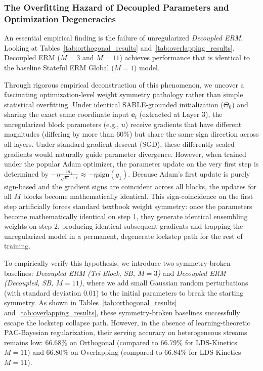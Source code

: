 \subsubsection{The Overfitting Hazard of Decoupled Parameters and Optimization Degeneracies}
An essential empirical finding is the failure of unregularized \emph{Decoupled ERM}. Looking at Tables~\ref{tab:orthogonal_results} and~\ref{tab:overlapping_results}, Decoupled ERM ($M=3$ and $M=11$) achieves performance that is identical to the baseline Stateful ERM Global ($M=1$) model. 

Through rigorous empirical deconstruction of this phenomenon, we uncover a fascinating optimization-level weight symmetry pathology rather than simple statistical overfitting. Under identical SABLE-grounded initialization ($\Theta_0$) and sharing the exact same coordinate input $\mathbf{e}_t$ (extracted at Layer 3), the unregularized block parameters (e.g., $u$) receive gradients that have different magnitudes (differing by more than $60\%$) but share the same sign direction across all layers. Under standard gradient descent (SGD), these differently-scaled gradients would naturally guide parameter divergence. However, when trained under the popular Adam optimizer, the parameter update on the very first step is determined by $-\eta \frac{m_1}{\sqrt{v_1} + \epsilon} \approx -\eta \text{sign}(g_1)$. Because Adam's first update is purely sign-based and the gradient signs are coincident across all blocks, the updates for all $M$ blocks become mathematically identical. This sign-coincidence on the first step artificially forces standard textbook weight symmetry: once the parameters become mathematically identical on step 1, they generate identical ensembling weights on step 2, producing identical subsequent gradients and trapping the unregularized model in a permanent, degenerate lockstep path for the rest of training.

To empirically verify this hypothesis, we introduce two symmetry-broken baselines: \emph{Decoupled ERM (Tri-Block, SB, $M=3$)} and \emph{Decoupled ERM (Decoupled, SB, $M=11$)}, where we add small Gaussian random perturbations (with standard deviation $0.01$) to the initial parameters to break the starting symmetry. As shown in Tables~\ref{tab:orthogonal_results} and~\ref{tab:overlapping_results}, these symmetry-broken baselines successfully escape the lockstep collapse path. However, in the absence of learning-theoretic PAC-Bayesian regularization, their serving accuracy on heterogeneous streams remains low: $66.68\%$ on Orthogonal (compared to $66.79\%$ for LDS-Kinetics $M=11$) and $66.80\%$ on Overlapping (compared to $66.84\%$ for LDS-Kinetics $M=11$).

